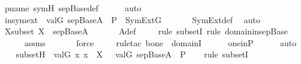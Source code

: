 \begin{isabellebody}
\ pname\ symH\ sep{\isacharunderscore}{\kern0pt}Base{\isacharunderscore}{\kern0pt}def\isanewline
\ \ \ \ \isamarkupfalse%
\ auto\ \isanewline
\isanewline
\ \ \isamarkupfalse%
\ \isamarkupfalse%
\ insymext\ {\isacharcolon}{\kern0pt}\ {\isachardoublequoteopen}val{\isacharparenleft}{\kern0pt}G{\isacharcomma}{\kern0pt}\ sep{\isacharunderscore}{\kern0pt}Base{\isacharparenleft}{\kern0pt}A{\isacharparenright}{\kern0pt}\ {\isasymtimes}\ P{\isacharparenright}{\kern0pt}\ {\isasymin}\ SymExt{\isacharparenleft}{\kern0pt}G{\isacharparenright}{\kern0pt}{\isachardoublequoteclose}\ \isanewline
\ \ \ \ \isamarkupfalse%
\ SymExt{\isacharunderscore}{\kern0pt}def\ \isamarkupfalse%
\ auto\ \isanewline
\isanewline
\ \ \isamarkupfalse%
\ Xsubset{\isacharcolon}{\kern0pt}\ {\isachardoublequoteopen}X\ {\isasymsubseteq}\ sep{\isacharunderscore}{\kern0pt}Base{\isacharparenleft}{\kern0pt}A{\isacharparenright}{\kern0pt}{\isachardoublequoteclose}\ \isanewline
\ \ \ \ \isamarkupfalse%
\ A{\isacharunderscore}{\kern0pt}def\isanewline
\ \ \ \ \isamarkupfalse%
{\isacharparenleft}{\kern0pt}rule\ subsetI{\isacharcomma}{\kern0pt}\ rule\ domain{\isacharunderscore}{\kern0pt}in{\isacharunderscore}{\kern0pt}sep{\isacharunderscore}{\kern0pt}Base{\isacharparenright}{\kern0pt}\isanewline
\ \ \ \ \isamarkupfalse%
\ assms\isanewline
\ \ \ \ \ \isamarkupfalse%
\ force\isanewline
\ \ \ \ \isamarkupfalse%
{\isacharparenleft}{\kern0pt}rule{\isacharunderscore}{\kern0pt}tac\ b{\isacharequal}{\kern0pt}one\ \ domainI{\isacharparenright}{\kern0pt}\isanewline
\ \ \ \ \isamarkupfalse%
\ one{\isacharunderscore}{\kern0pt}in{\isacharunderscore}{\kern0pt}P\isanewline
\ \ \ \ \isamarkupfalse%
\ auto\ \isanewline
\isanewline
\ \ \isamarkupfalse%
\ subsetH{\isacharcolon}{\kern0pt}\ {\isachardoublequoteopen}{\isacharbraceleft}{\kern0pt}\ val{\isacharparenleft}{\kern0pt}G{\isacharcomma}{\kern0pt}\ x{\isacharparenright}{\kern0pt}{\isachardot}{\kern0pt}\ x\ {\isasymin}\ X\ {\isacharbraceright}{\kern0pt}\ {\isasymsubseteq}\ val{\isacharparenleft}{\kern0pt}G{\isacharcomma}{\kern0pt}\ sep{\isacharunderscore}{\kern0pt}Base{\isacharparenleft}{\kern0pt}A{\isacharparenright}{\kern0pt}\ {\isasymtimes}\ P{\isacharparenright}{\kern0pt}{\isachardoublequoteclose}\ \isanewline
\ \ \isamarkupfalse%
{\isacharparenleft}{\kern0pt}rule\ subsetI{\isacharparenright}{\kern0pt}\isanewline

\end{isabellebody}

